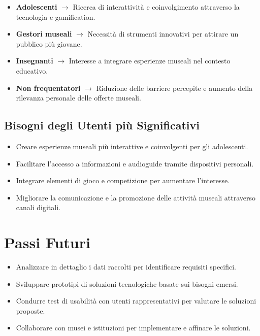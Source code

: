 \documentclass{article}
\begin{document}
\begin{itemize}
    \item \textbf{Adolescenti} $\rightarrow$ Ricerca di interattività e coinvolgimento attraverso la tecnologia e gamification.
    \item \textbf{Gestori museali} $\rightarrow$ Necessità di strumenti innovativi per attirare un pubblico più giovane.
    \item \textbf{Insegnanti} $\rightarrow$ Interesse a integrare esperienze museali nel contesto educativo.
    \item \textbf{Non frequentatori} $\rightarrow$ Riduzione delle barriere percepite e aumento della rilevanza personale delle offerte museali.
\end{itemize}

\subsection{Bisogni degli Utenti più Significativi}

\begin{itemize}
    \item Creare esperienze museali più interattive e coinvolgenti per gli adolescenti.
    \item Facilitare l'accesso a informazioni e audioguide tramite dispositivi personali.
    \item Integrare elementi di gioco e competizione per aumentare l'interesse.
    \item Migliorare la comunicazione e la promozione delle attività museali attraverso canali digitali.
\end{itemize}

\section{Passi Futuri}

\begin{itemize}
    \item Analizzare in dettaglio i dati raccolti per identificare requisiti specifici.
    \item Sviluppare prototipi di soluzioni tecnologiche basate sui bisogni emersi.
    \item Condurre test di usabilità con utenti rappresentativi per valutare le soluzioni proposte.
    \item Collaborare con musei e istituzioni per implementare e affinare le soluzioni.
\end{itemize}
\end{document}
